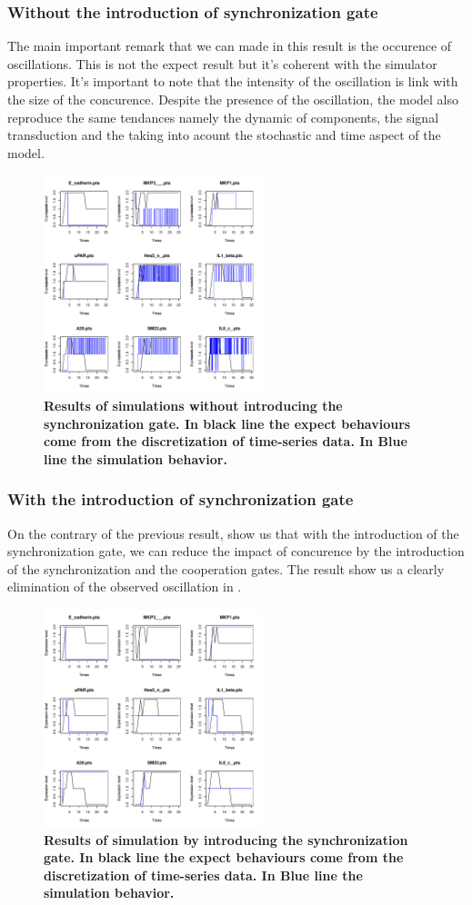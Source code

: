 \subsubsection{Without the introduction of synchronization gate}
The main important remark that we can made in this result  is the occurence of oscillations. This is not the expect result 
but it's coherent with the simulator properties. It's important to note that the intensity of the oscillation is link with 
the size of the concurence. Despite the presence of the oscillation, the model also reproduce the same tendances namely
the dynamic of components, the signal transduction and the taking into acount the stochastic and time aspect of the model.
\begin{figure}[!t]
\centering
\includegraphics[width=2.5in]{images/resultWOS.pdf}
\caption{\bf Results of simulations without introducing the synchronization gate. In black line the expect behaviours
come from the discretization of time-series data. In Blue line the simulation behavior.}
\label{fig:rwos}
\end{figure}
\subsubsection{With the introduction of synchronization gate}
On the contrary of the previous result,  show us that with the introduction of the synchronization gate, we can
reduce the impact of concurence by the introduction of the synchronization and the cooperation gates. The result show us a 
clearly elimination of the observed oscillation in . 

\begin{figure}[!t]
\centering
\includegraphics[width=2.5in]{images/resultWS.pdf}
\caption{\bf Results of simulation by introducing the synchronization gate. In black line the expect behaviours
come from the discretization of time-series data. In Blue line the simulation behavior.}
\label{fig:rws}
\end{figure}


